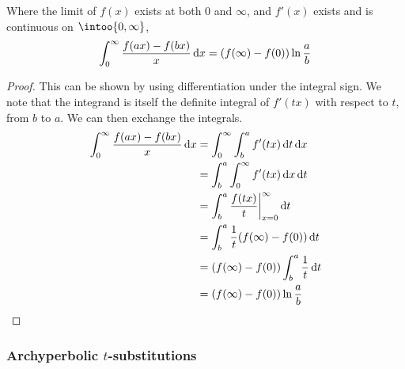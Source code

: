 \begin{theorem}
 Where the limit of \(f(x)\) exists at both 0 and \(\infty\), and \(f'(x)\)
 exists and is continuous on \(\intoo{0, \infty}\),
 \begin{equation*}
  \integ[0]<\infty>{\frac{f(ax) - f(bx)} x}{x}
  = (f(\infty) - f(0))\ln \frac ab
 \end{equation*}
\end{theorem}
\begin{proof}
 This can be shown by using differentiation under the integral sign. We note
 that the integrand is itself the definite integral of \(f'(tx)\) with
 respect to \(t\), from \(b\) to \(a\). We can then exchange the integrals.
 \begin{align*}
  \integ[0]<\infty>{\frac{f(ax) - f(bx)} x}{x} &=
  \integ[0]<\infty>{\integ[b]<a>{f'(tx)}{t}}{x} \\
  &= \integ[b]<a>{\integ[0]<\infty>{f'(tx)}{x}}{t} \\
  &= \integ[b]<a>{\frac{f(tx)}{t}\eval_{x=0}^\infty}{t} \\
  &= \integ[b]<a>{\frac 1t(f(\infty) - f(0))}{t} \\
  &= (f(\infty) - f(0))\integ[b]<a>{\frac 1t}{t} \\
  &= (f(\infty) - f(0))\ln \frac ab \qedhere
 \end{align*}
\end{proof}

\subsubsection[Archyperbolic \texorpdfstring{\(t\)}{t} substitutions]
              {Archyperbolic \boldmath\(t\)-substitutions}


